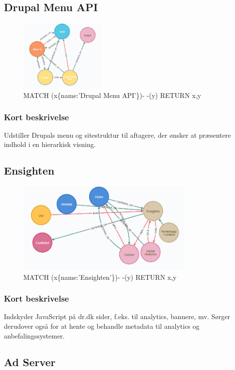 \documentclass{article}
\begin{document}
\subsection{Drupal Menu API}
\begin{figure}[h]
\includegraphics[width=120pt]{DrupalMenuAPI.PNG}
\caption{MATCH (x\{name:'Drupal Menu API'\})- -(y) RETURN x,y}
\end{figure}
\subsubsection*{Kort beskrivelse}
Udstiller Drupals menu og sitestruktur til aftagere, der ønsker at præsentere indhold i en hierarkisk visning.


\subsection{Ensighten}
\begin{figure}[h]
\includegraphics[width=250pt]{Ensighten.PNG}
\caption{MATCH (x\{name:'Ensighten'\})- -(y) RETURN x,y}
\end{figure}
\subsubsection*{Kort beskrivelse}
Indskyder JavaScript på dr.dk sider, f.eks. til analytics, bannere, mv. Sørger derudover også for at hente og behandle metadata til analytics og anbefalingssystemer.



\subsection{Ad Server}
\end{document}
